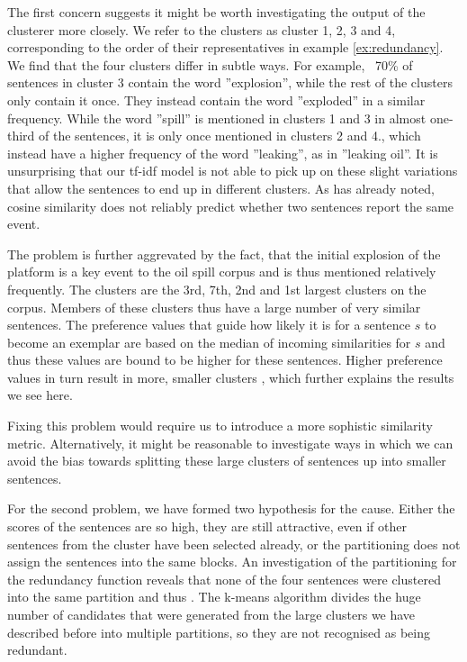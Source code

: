 \documentclass[a4paper,BCOR=10mm]{report}
\numberwithin{lemma}{chapter}
\numberwithin{definition}{chapter}
\begin{document}
The first concern suggests it might be worth investigating the output of the clusterer more closely.
We refer to the clusters as cluster 1, 2, 3 and 4, corresponding to the order of their representatives in example \ref{ex:redundancy}.
We find that the four clusters differ in subtle ways.
For example, ~70\% of sentences in cluster 3 contain the word ''explosion'', while the rest of the clusters only contain it once. They instead contain the word ''exploded'' in a similar frequency.
While the word ''spill'' is mentioned in clusters 1 and 3 in almost one-third of the sentences, it is only once mentioned in clusters 2 and 4., which instead have a higher frequency of the word ''leaking'', as in ''leaking oil''.
It is unsurprising that our tf-idf model is not able to pick up on these slight variations that allow the sentences to end up in different clusters. As \citet{chieu} has already noted, cosine similarity does not reliably predict whether two sentences report the same event.

The problem is further aggrevated by the fact, that the initial explosion of the platform is a key event to the oil spill corpus and is thus mentioned relatively frequently. The clusters are the 3rd, 7th, 2nd and 1st largest clusters on the corpus. Members of these clusters thus have a large number of very similar sentences. The preference values that guide how likely it is for a sentence $s$ to become an exemplar are based on the median of incoming similarities for $s$ and thus these values are bound to be higher for these sentences.
Higher preference values in turn result in more, smaller clusters \citep{ap}, which further explains the results we see here.

Fixing this problem would require us to introduce a more sophistic similarity metric. Alternatively, it might be reasonable to investigate ways in which we can avoid the bias towards splitting these large clusters of sentences up into smaller sentences.

For the second problem, we have formed two hypothesis for the cause. Either the scores of the sentences are so high, they are still attractive, even if other sentences from the cluster have been selected already, or the partitioning does not assign the sentences into the same blocks.
An investigation of the partitioning for the redundancy function reveals that none of the four sentences were clustered into the same partition and thus . The k-means algorithm divides the huge number of candidates that were generated from the large clusters we have described before into multiple partitions, so they are not recognised as being redundant.
\end{document}
